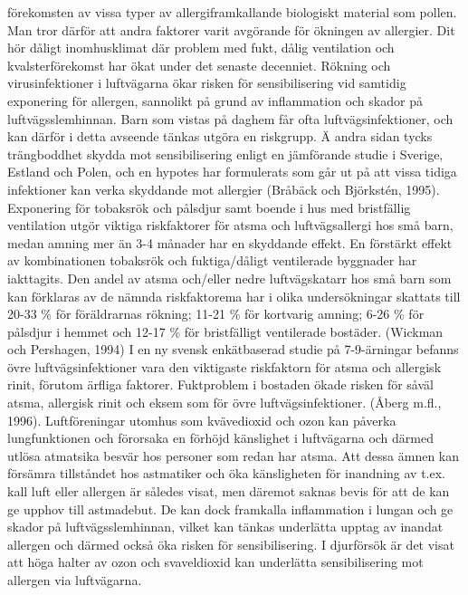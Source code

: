 förekomsten av vissa typer av allergiframkallande biologiskt material som pollen. Man tror därför att andra faktorer varit avgörande för ökningen av allergier. Dit hör dåligt inomhusklimat där problem med fukt, dålig ventilation och kvalsterförekomst har ökat under det senaste decenniet. Rökning och virusinfektioner i luftvägarna ökar risken för sensibilisering vid samtidig exponering för allergen, sannolikt på grund av inflammation och skador på luftvägsslemhinnan. Barn som vistas på daghem får ofta luftvägsinfektioner, och kan därför i detta avseende tänkas utgöra en riskgrupp. Ä andra sidan tycks trängboddhet skydda mot sensibilisering enligt en jämförande studie i Sverige, Estland och Polen, och en hypotes har formulerats som går ut på att vissa tidiga infektioner kan verka skyddande mot allergier (Bråbäck och Björkstén, 1995).
Exponering för tobaksrök och pålsdjur samt boende i hus med bristfällig ventilation utgör viktiga riskfaktorer för atsma och luftvägsallergi hos små barn, medan amning mer än 3-4 månader har en skyddande effekt. En förstärkt effekt av kombinationen tobaksrök och fuktiga/dåligt ventilerade byggnader har iakttagits. Den andel av atsma och/eller nedre luftvägskatarr hos små barn som kan förklaras av de nämnda riskfaktorema har i olika undersökningar skattats till 20-33 \% för föräldrarnas rökning; 11-21 \% för kortvarig amning; 6-26 \% för pålsdjur i hemmet och 12-17 \% för bristfälligt ventilerade bostäder. (Wickman och Pershagen, 1994) I en ny svensk enkätbaserad studie på 7-9-ärningar befanns övre luftvägsinfektioner vara den viktigaste riskfaktorn för atsma och allergisk rinit, förutom ärfliga faktorer. Fuktproblem i bostaden ökade risken för såväl atsma, allergisk rinit och eksem som för övre luftvägsinfektioner. (Åberg m.fl., 1996).
Luftföreningar utomhus som kvävedioxid och ozon kan påverka lungfunktionen och förorsaka en förhöjd känslighet i luftvägarna och därmed utlösa atmatsika besvär hos personer som redan har atsma. Att dessa ämnen kan försämra tillståndet hos astmatiker och öka känsligheten för inandning av t.ex. kall luft eller allergen är således visat, men däremot saknas bevis för att de kan ge upphov till astmadebut. De kan dock framkalla inflammation i lungan och ge skador på luftvägsslemhinnan, vilket kan tänkas underlätta upptag av inandat allergen och därmed också öka risken för sensibilisering. I djurförsök är det visat att höga halter av ozon och svaveldioxid kan underlätta sensibilisering mot allergen via luftvägarna.

